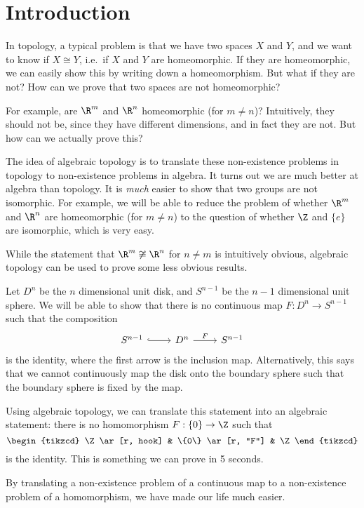 \documentclass[a4paper]{article}
\begin{document}
\tableofcontents

\setcounter{section}{-1}
\section{Introduction}
In topology, a typical problem is that we have two spaces $X$ and $Y$, and we want to know if $X\cong Y$, i.e.\ if $X$ and $Y$ are homeomorphic. If they are homeomorphic, we can easily show this by writing down a homeomorphism. But what if they are not? How can we prove that two spaces are not homeomorphic?

For example, are $\R^m$ and $\R^n$ homeomorphic (for $m\not= n$)? Intuitively, they should not be, since they have different dimensions, and in fact they are not. But how can we actually prove this?

The idea of algebraic topology is to translate these non-existence problems in topology to non-existence problems in algebra. It turns out we are much better at algebra than topology. It is \emph{much} easier to show that two groups are not isomorphic. For example, we will be able to reduce the problem of whether $\R^m$ and $\R^n$ are homeomorphic (for $m \not= n$) to the question of whether $\Z$ and $\{e\}$ are isomorphic, which is very easy.

While the statement that $\R^m \not\cong \R^n$ for $n \not= m$ is intuitively obvious, algebraic topology can be used to prove some less obvious results.

Let $D^n$ be the $n$ dimensional unit disk, and $S^{n - 1}$ be the $n-1$ dimensional unit sphere. We will be able to show that there is no continuous map $F: D^n \to S^{n - 1}$ such that the composition
\[
  \begin{tikzcd}
    S^{n - 1} \ar[r, hook] & D^n \ar[r, "F"] & S^{n - 1}
  \end{tikzcd}
\]
is the identity, where the first arrow is the inclusion map. Alternatively, this says that we cannot continuously map the disk onto the boundary sphere such that the boundary sphere is fixed by the map.

Using algebraic topology, we can translate this statement into an algebraic statement: there is no homomorphism $F: \{0\} \to \Z$ such that
\[
  \begin{tikzcd}
    \Z \ar[r, hook] & \{0\} \ar[r, "F"] & \Z
  \end{tikzcd}
\]
is the identity. This is something we can prove in 5 seconds.

By translating a non-existence problem of a continuous map to a non-existence problem of a homomorphism, we have made our life much easier.
\end{document}
